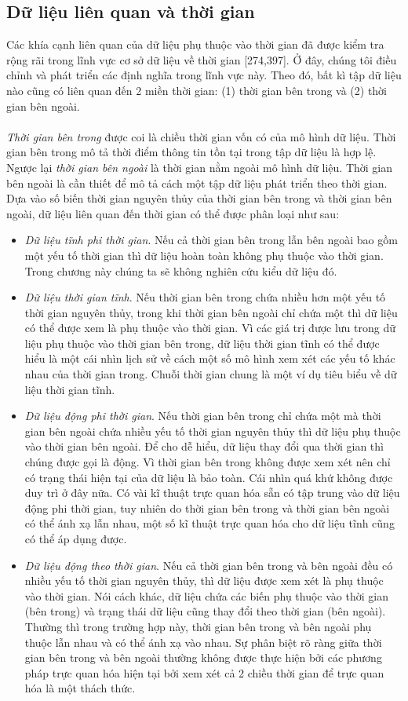 \subsection{Dữ liệu liên quan và thời gian}
Các khía cạnh liên quan của dữ liệu phụ thuộc vào thời gian đã được kiểm tra rộng rãi trong lĩnh vực cơ sở dữ liệu về thời gian [274,397]. Ở đây, chúng tôi điều chỉnh và phát triển các định nghĩa trong lĩnh vực này. Theo đó, bất kì tập dữ liệu nào cũng có liên quan đến 2 miền thời gian: (1) thời gian bên trong và (2) thời gian bên ngoài. 
\\ \\
\textit{Thời gian bên trong} được coi là chiều thời gian vốn có của mô hình dữ liệu. Thời gian bên trong mô tả thời điểm thông tin tồn tại trong tập dữ liệu là hợp lệ. Ngược lại \textit{thời gian bên ngoài} là thời gian nằm ngoài mô hình dữ liệu. Thời gian bên ngoài là cần thiết để mô tả cách một tập dữ liệu phát triển theo thời gian. Dựa vào số biến thời gian nguyên thủy của thời gian bên trong và thời gian bên ngoài, dữ liệu liên quan đến thời gian có thể được phân loại như sau:
\begin{itemize}
    \item \textit{Dữ liệu tĩnh phi thời gian}. Nếu cả thời gian bên trong lẫn bên ngoài bao gồm một yếu tố thời gian thì dữ liệu hoàn toàn không phụ thuộc vào thời gian. Trong chương này chúng ta sẽ không nghiên cứu kiểu dữ liệu đó.
    \item \textit{Dữ liệu thời gian tĩnh}. Nếu thời gian bên trong chứa nhiều hơn một yếu tố thời gian nguyên thủy, trong khi thời gian bên ngoài chỉ chứa một thì dữ liệu có thể được xem là phụ thuộc vào thời gian. Vì các giá trị được lưu trong dữ liệu phụ thuộc vào thời gian bên trong, dữ liệu thời gian tĩnh có thể được hiểu là một cái nhìn lịch sử về cách một số mô hình xem xét các yếu tố khác nhau của thời gian trong. Chuỗi thời gian chung là một ví dụ tiêu biểu về dữ liệu thời gian tĩnh. 
    \item \textit{Dữ liệu động phi thời gian}. Nếu thời gian bên trong chỉ chứa một mà thời gian bên ngoài chứa nhiều yếu tố thời gian nguyên thủy thì dữ liệu phụ thuộc vào thời gian bên ngoài. Để cho dễ hiểu, dữ liệu thay đổi qua thời gian thì chúng được gọi là động. Vì thời gian bên trong không được xem xét nên chỉ có trạng thái hiện tại của dữ liệu là bảo toàn. Cái nhìn quá khứ không được duy trì ở đây nữa. Có vài kĩ thuật trực quan hóa sẵn có tập trung vào dữ liệu động phi thời gian, tuy nhiên do thời gian bên trong và thời gian bên ngoài có thể ánh xạ lẫn nhau, một số kĩ thuật trực quan hóa cho dữ liệu tĩnh cũng có thể áp dụng được.
    \item \textit{Dữ liệu động theo thời gian}. Nếu cả thời gian bên trong và bên ngoài đều có nhiều yếu tố thời gian nguyên thủy, thì dữ liệu được xem xét là phụ thuộc vào thời gian. Nói cách khác, dữ liệu chứa các biến phụ thuộc vào thời gian (bên trong) và trạng thái dữ liệu cũng thay đổi theo thời gian (bên ngoài). Thường thì trong trường hợp này, thời gian bên trong và bên ngoài phụ thuộc lẫn nhau và có thể ánh xạ vào nhau. Sự phân biệt rõ ràng giữa thời gian bên trong và bên ngoài thường không được thực hiện bởi các phương pháp trực quan hóa hiện tại bởi xem xét cả 2 chiều thời gian để trực quan hóa là một thách thức.
\end{itemize}